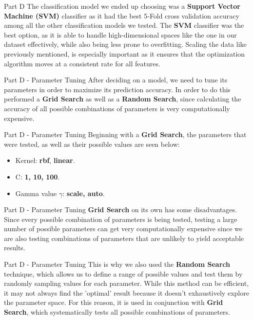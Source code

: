 \documentclass{beamer}
\begin{document}
    \begin{frame}{Part D}
    The classification model we ended up choosing was a \textbf{Support Vector Machine (SVM)} classifier as it had the best 5-Fold
    cross validation accuracy among all the other classification models we tested. The \textbf{SVM} classifier was the best option,
    as it is able to handle high-dimensional spaces like the one in our dataset effectively, while also being less prone to
    overfitting. Scaling the data like previously mentioned, is especially important as it ensures that the optimization
    algorithm moves at a consistent rate for all features.
    \end{frame}

    \begin{frame}{Part D - Parameter Tuning}
    After deciding on a model, we need to tune its parameters in order to maximize its prediction accuracy. 
    In order to do this performed a \textbf{Grid Search} as well as a \textbf{Random Search}, since calculating
    the accuracy of all possible combinations of parameters is very computationally expensive.
    \end{frame}

    \begin{frame}{Part D - Parameter Tuning}
    Beginning with a \textbf{Grid Search}, the parameters that were tested, as well as their possible values are seen below:
    \begin{itemize}
        \item Kernel: \textbf{rbf}, \textbf{linear}.
        \item C: \textbf{1, 10, 100}.
        \item Gamma value $\gamma$: \textbf{scale, auto}.
    \end{itemize}
    \end{frame}

    \begin{frame}{Part D - Parameter Tuning}
    \textbf{Grid Search} on its own has some disadvantages. Since every possible combination of parameters is being tested,
    testing a large number of possible parameters can get very computationally expensive since we are also testing combinations
    of parameters that are unlikely to yield acceptable results.
    \end{frame}

    \begin{frame}{Part D - Parameter Tuning}
    This is why we also used the \textbf{Random Search} technique, which allows us to define a range of possible values and 
    test them by randomly sampling values for each parameter. While this method can be efficient, it may not always find the
    'optimal' result because it doesn't exhaustively explore the parameter space. For this reason, it is used in conjunction with 
    \textbf{Grid Search}, which systematically tests all possible combinations of parameters.
    \end{frame}
\end{document}

